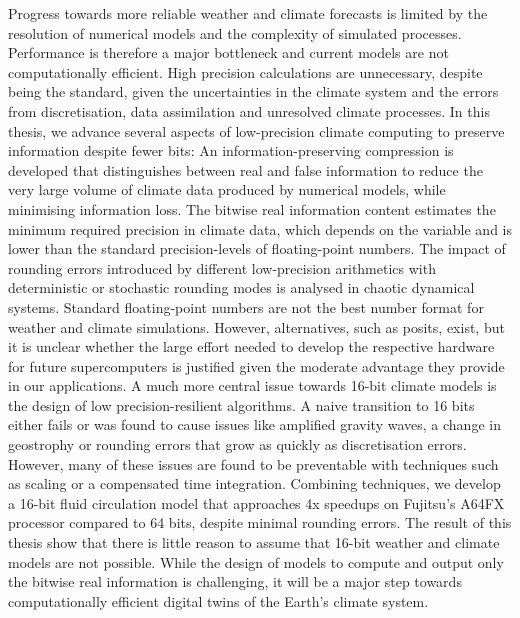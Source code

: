 \begin{abstracts}

Progress towards more reliable weather and climate forecasts is limited by the resolution of numerical models and the complexity of simulated
processes. Performance is therefore a major bottleneck and current models are not computationally efficient. High precision calculations are
unnecessary, despite being the standard, given the uncertainties in the climate system and the errors from discretisation, data assimilation
and unresolved climate processes. In this thesis, we advance several aspects of low-precision climate computing to preserve information despite
fewer bits: An information-preserving compression is developed that distinguishes between real and false information to reduce the very large
volume of climate data produced by numerical models, while minimising information loss. The bitwise real information content estimates the
minimum required precision in climate data, which depends on the variable and is lower than the standard precision-levels of floating-point numbers. 
The impact of rounding errors introduced by different low-precision arithmetics with deterministic or stochastic rounding modes is analysed
in chaotic dynamical systems. Standard floating-point numbers are not the best number format for weather and climate simulations. However,
alternatives, such as posits, exist, but it is unclear whether the large effort needed to develop the respective hardware for future supercomputers
is justified given the moderate advantage they provide in our applications. A much more central issue towards 16-bit climate models is the design
of low precision-resilient algorithms. A naive transition to 16 bits either fails or was found to cause issues like amplified gravity waves,
a change in geostrophy or rounding errors that grow as quickly as discretisation errors. However, many of these issues are found to be
preventable with techniques such as scaling or a compensated time integration. Combining techniques, we develop a 16-bit fluid circulation
model that approaches 4x speedups on Fujitsu's A64FX processor compared to 64 bits, despite minimal rounding errors. The result of this
thesis show that there is little reason to assume that 16-bit weather and climate models are not possible. While the design of models to
compute and output only the bitwise real information is challenging, it will be a major step towards computationally efficient digital twins
of the Earth's climate system.


\end{abstracts}

